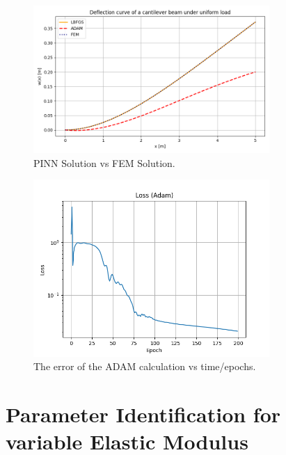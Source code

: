 \documentclass[a4paper,11pt]{article}
\begin{document}
\begin{figure}[H]
    \centering
    \includegraphics[width=0.8\textwidth]{Charts/FEM_Solution.png}
    \caption{PINN Solution vs FEM Solution.}
    \label{fig:example}
\end{figure}


\begin{figure}[H]
    \centering
    \includegraphics[width=0.8\textwidth]{Charts/Error_Adam.png}
    \caption{The error of the ADAM calculation vs time/epochs.}
    \label{fig:example}
\end{figure}

\section{Parameter Identification for variable Elastic Modulus}
\end{document}
